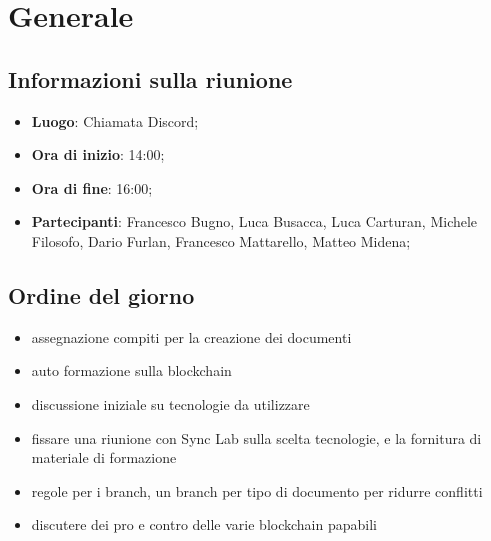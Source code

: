 \section{Generale}

\vspace{10pt}


\subsection{Informazioni sulla riunione}
\begin{itemize}
	\item \textbf{Luogo}: Chiamata Discord;
	\item \textbf{Ora di inizio}: 14:00;
	\item \textbf{Ora di fine}: 16:00;
	\item \textbf{Partecipanti}: Francesco Bugno, Luca Busacca, Luca Carturan, Michele Filosofo,
	Dario Furlan, Francesco Mattarello, Matteo Midena;
\end{itemize}

\vspace{5pt}

\subsection{Ordine del giorno}

\begin{itemize}
	\item assegnazione compiti per la creazione dei documenti
	\item auto formazione sulla blockchain
	\item discussione iniziale su tecnologie da utilizzare
	\item fissare una riunione con Sync Lab sulla scelta tecnologie, e la fornitura di materiale di formazione
	\item regole per i branch, un branch per tipo di documento per ridurre conflitti
	\item discutere dei pro e contro delle varie blockchain papabili
\end{itemize}
